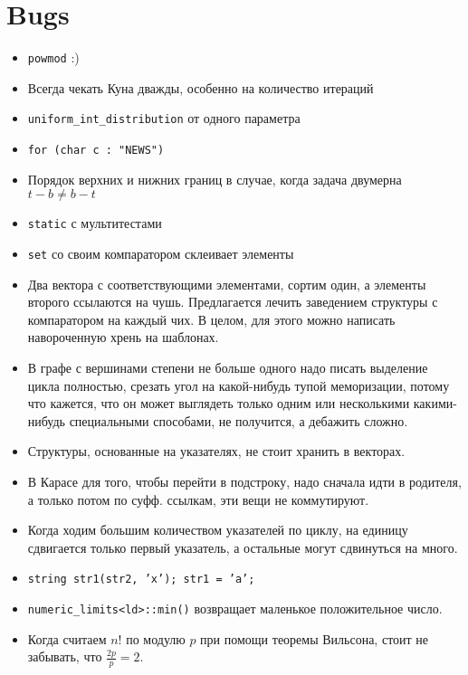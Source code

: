 \section{Bugs}

\begin{itemize}
	\item \texttt{powmod} :)

	\item Всегда чекать Куна дважды, особенно на количество итераций

	\item \texttt{uniform_int_distribution} от одного параметра

	\item \texttt{for (char c : "NEWS")}

	\item Порядок верхних и нижних границ в случае, когда задача двумерна
		$t - b \neq b - t$

	\item \texttt{static} с мультитестами

	\item \texttt{set} со своим компаратором склеивает элементы

	\item Два вектора с соответствующими элементами, сортим один, а элементы
		второго ссылаются на чушь. Предлагается лечить заведением структуры с
		компаратором на каждый чих. В целом, для этого можно написать навороченную
		хрень на шаблонах.

	\item В графе с вершинами степени не больше одного надо писать выделение
		цикла полностью, срезать угол на какой-нибудь тупой меморизации, потому
		что кажется, что он может выглядеть только одним или несколькими
		какими-нибудь специальными способами, не получится, а дебажить сложно.

	\item Структуры, основанные на указателях, не стоит хранить в векторах.

	\item В Карасе для того, чтобы перейти в подстроку, надо сначала идти в
		родителя, а только потом по суфф. ссылкам, эти вещи не коммутируют.

	\item Когда ходим большим количеством указателей по циклу, на единицу
		сдвигается только первый указатель, а остальные могут сдвинуться на много.

	\item \texttt{string str1(str2, 'x'); str1 = 'a';}

	\item \texttt{numeric_limits<ld>::min()} возвращает маленькое положительное число.

	\item Когда считаем $n!$ по модулю $p$ при помощи теоремы Вильсона, стоит не забывать, что $\frac{2p}{p} = 2$.
\end{itemize}
